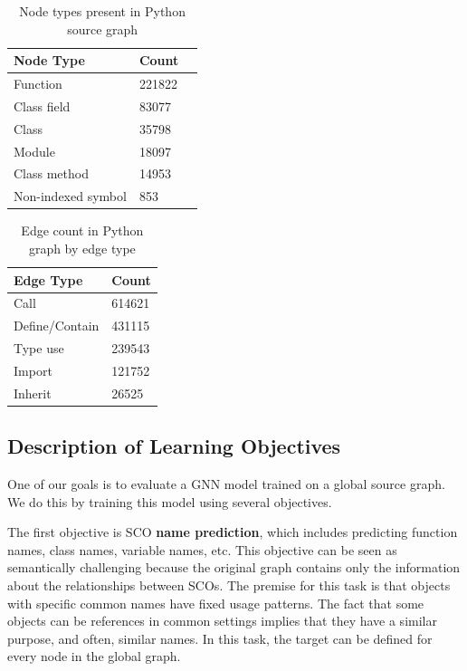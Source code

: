 \documentclass[a4paper,twoside]{article}
\begin{document}
\begin{table}[]
\centering
\begin{tabular}{lll}
    \toprule
    \textbf{Node Type}        & \textbf{Count}  \\ \midrule
    Function        & 221822 \\ \midrule
    Class field     & 83077 \\ \midrule
    Class           & 35798 \\ \midrule
    Module          & 18097 \\ \midrule
    Class method    & 14953 \\ \midrule
    Non-indexed symbol  & 853  \\ \bottomrule
\end{tabular}
\caption{Node types present in Python source graph\label{tbl:python_node_count}}
\end{table}

\begin{table}[]
\centering
\begin{tabular}{ll}
\toprule
\textbf{Edge Type}       & \textbf{Count} \\ \midrule
Call            & 614621 \\ \midrule
Define/Contain  & 431115 \\ \midrule
Type use        & 239543 \\ \midrule
Import          & 121752 \\ \midrule
Inherit         & 26525 \\ \bottomrule
\end{tabular}
\caption{Edge count in Python graph by edge type\label{tbl:python_edge_count}}
\end{table}

\subsection{Description of Learning Objectives}\label{sec:objectives}

One of our goals is to evaluate a GNN model trained on a global source graph. We do this by training this model using several objectives.

The first objective is SCO \textbf{name prediction}, which includes predicting function names, class names, variable names, etc. This objective can be seen as semantically challenging because the original graph contains only the information about the relationships between SCOs. The premise for this task is that objects with specific common names have fixed usage patterns. The fact that some objects can be references in common settings implies that they have a similar purpose, and often, similar names. In this task, the target can be defined for every node in the global graph.
\end{document}
